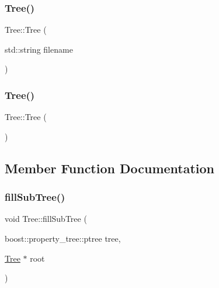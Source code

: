 \subsubsection{\texorpdfstring{Tree()}{Tree()}\hspace{0.1cm}{\footnotesize\ttfamily [1/2]}}
{\footnotesize\ttfamily Tree\+::\+Tree (\begin{DoxyParamCaption}\item[{std\+::string}]{filename }\end{DoxyParamCaption})}

\mbox{\label{class_tree_ad376a7c639d857312f5de2ef47482f68}} 
\subsubsection{\texorpdfstring{Tree()}{Tree()}\hspace{0.1cm}{\footnotesize\ttfamily [2/2]}}
{\footnotesize\ttfamily Tree\+::\+Tree (\begin{DoxyParamCaption}{ }\end{DoxyParamCaption})}



\subsection{Member Function Documentation}
\mbox{\label{class_tree_ae4c4da2bdb7f83b3d9394c6bdf4bff3b}} 
\subsubsection{\texorpdfstring{fill\+Sub\+Tree()}{fillSubTree()}}
{\footnotesize\ttfamily void Tree\+::fill\+Sub\+Tree (\begin{DoxyParamCaption}\item[{boost\+::property\+\_\+tree\+::ptree}]{tree,  }\item[{\hyperlink{class_tree}{Tree} $\ast$}]{root }\end{DoxyParamCaption})}

\mbox{\label{class_tree_ab88f67717ecef951fac69e530ded3e5d}} 
